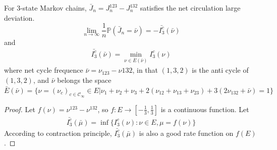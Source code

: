 \documentclass[11pt,en,cite=authoryear]{elegantpaper}
\begin{document}
\begin{corollary}
    For 3-state Markov chains, $\bar{J}_n = J^{123}_n - J^{132}_n$ satisfies the net circulation large deviation.
    \begin{equation*} \label{eq:net}
        \lim_{n \rightarrow \infty} \frac{1}{n} \mathbb{P}(\bar{J}_n = \bar{\nu}) = - \bar{I^c_3}(\bar{\nu})
    \end{equation*}
    and
    \begin{align*}
        \bar{I^c_3}(\bar{\nu}) = \min_{\nu \in \bar{E}(\bar{\nu})} I^c_3(\nu)
    \end{align*}
    where net cycle frequence $\bar{\nu} = \nu_{123} - \nu{132}$, in that $(1,3,2)$ is the anti cycle of $(1,3,2)$, and $\bar{\nu}$ belongs the space
    $\bar{E}(\bar{\nu}) = \{\nu = (\nu_c)_{c \in \mathcal{C}_{\infty}} \in E | \nu_1 +\nu_2 +\nu_3 +2(\nu_{12} +\nu_{13} +\nu_{23}) +3(2\nu_{132} +\bar{\nu})=1\}$
\end{corollary}
\begin{proof}
    Let $f(\nu) = \nu^{123} - \nu^{132}$, so $f: E \rightarrow [-\frac{1}{3}, \frac{1}{3}]$ is a continuous function. Let
    \begin{align*}
        \bar{I^c_3}(\bar{\mu}) = \inf \{I^c_3(\nu): \nu \in E, \mu = f(\nu)\}
    \end{align*}
    According to contraction principle, $\bar{I^c_3}(\bar{\mu})$ is also a good rate function on $f(E)$.
\end{proof}
\end{document}

